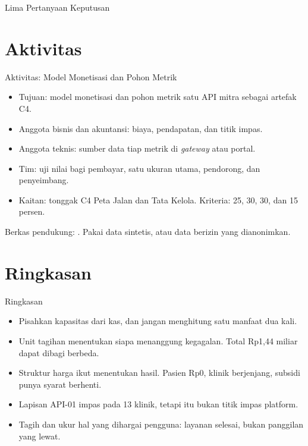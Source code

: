 \documentclass[aspectratio=169, table, 12pt]{beamer}
\begin{document}
\begin{frame}{{\Large Lima Pertanyaan Keputusan}}
  \centering
\end{frame}

\section{Aktivitas}

\begin{frame}{{\Large Aktivitas: Model Monetisasi dan Pohon Metrik}}
  \vspace{4pt}
  \begin{itemize}
    \item Tujuan: model monetisasi dan pohon metrik satu API mitra sebagai artefak C4.
    \item Anggota bisnis dan akuntansi: biaya, pendapatan, dan titik impas.
    \item Anggota teknis: sumber data tiap metrik di \textit{gateway} atau portal.
    \item Tim: uji nilai bagi pembayar, satu ukuran utama, pendorong, dan penyeimbang.
    \item Kaitan: tonggak C4 Peta Jalan dan Tata Kelola. Kriteria: 25, 30, 30, dan 15 persen.
  \end{itemize}
  \vspace{4pt}
  {\footnotesize Berkas pendukung: . Pakai data sintetis, atau data berizin yang dianonimkan.}
\end{frame}

\section{Ringkasan}

\begin{frame}{{\Large Ringkasan}}
  \vspace{4pt}
  \begin{itemize}
    \item Pisahkan kapasitas dari kas, dan jangan menghitung satu manfaat dua kali.
    \item Unit tagihan menentukan siapa menanggung kegagalan. Total Rp1,44 miliar dapat dibagi berbeda.
    \item Struktur harga ikut menentukan hasil. Pasien Rp0, klinik berjenjang, subsidi punya syarat berhenti.
    \item Lapisan API-01 impas pada 13 klinik, tetapi itu bukan titik impas platform.
    \item Tagih dan ukur hal yang dihargai pengguna: layanan selesai, bukan panggilan yang lewat.
  \end{itemize}
\end{frame}
\end{document}
